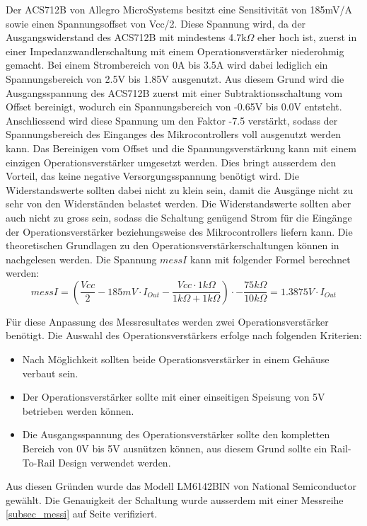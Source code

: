 Der ACS712B von Allegro MicroSystems besitzt eine Sensitivität von 185mV/A sowie einen Spannungsoffset von Vcc/2. Diese Spannung wird, da der Ausgangswiderstand des ACS712B mit mindestens 4.7k$\Omega$ eher hoch ist, zuerst in einer Impedanzwandlerschaltung mit einem Operationsverstärker niederohmig gemacht. Bei einem Strombereich von 0A bis 3.5A wird dabei lediglich ein Spannungsbereich von 2.5V bis 1.85V ausgenutzt. Aus diesem Grund wird die Ausgangsspannung des ACS712B zuerst mit einer Subtraktionsschaltung vom Offset bereinigt, wodurch ein Spannungsbereich von -0.65V bis 0.0V entsteht. Anschliessend wird diese Spannung um den Faktor -7.5 verstärkt, sodass der Spannungsbereich des Einganges des Mikrocontrollers voll ausgenutzt werden kann. Das Bereinigen vom Offset und die Spannungsverstärkung kann mit einem einzigen Operationsverstärker umgesetzt werden. Dies bringt ausserdem den Vorteil, das keine negative Versorgungsspannung benötigt wird. Die Widerstandswerte sollten dabei nicht zu klein sein, damit die Ausgänge nicht zu sehr von den Widerständen belastet werden. Die Widerstandswerte sollten aber auch nicht zu gross sein, sodass die Schaltung genügend Strom für die Eingänge der Operationsverstärker beziehungsweise des Mikrocontrollers liefern kann.  Die theoretischen Grundlagen zu den Operationsverstärkerschaltungen können in \cite{operationsverstaerker} nachgelesen werden. Die Spannung $messI$ kann mit folgender Formel berechnet werden:
\begin{equation}
	messI=\left(\frac{Vcc}{2}-185mV\cdot I_{Out}-\frac{Vcc\cdot 1k\Omega}{1k\Omega +1k\Omega}\right)\cdot -\frac{75k\Omega}{10k\Omega}=1.3875V\cdot I_{Out}
\label{eq:messI}
\end{equation}

Für diese Anpassung des Messresultates werden zwei Operationsverstärker benötigt. Die Auswahl des Operationsverstärkers erfolge nach folgenden Kriterien:
\begin{itemize}
	\item Nach Möglichkeit sollten beide Operationsverstärker in einem Gehäuse verbaut sein.
	\item Der Operationsverstärker sollte mit einer einseitigen Speisung von 5V betrieben werden können.
	\item Die Ausgangsspannung des Operationsverstärker sollte den kompletten Bereich von 0V bis 5V ausnützen können, aus diesem Grund sollte ein Rail-To-Rail Design verwendet werden.
\end{itemize}
Aus diesen Gründen wurde das Modell LM6142BIN von National Semiconductor gewählt. Die Genauigkeit der Schaltung wurde ausserdem mit einer Messreihe \ref{subsec_messi} auf Seite \pageref{subsec_messi} verifiziert.